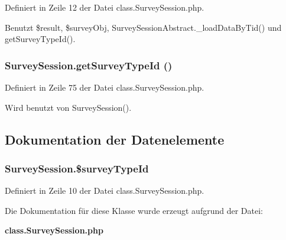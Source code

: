 Definiert in Zeile 12 der Datei class.SurveySession.php.

Benutzt \$result, \$surveyObj, SurveySessionAbstract.\_\-loadDataByTid() und getSurveyTypeId().
\subsubsection{\setlength{\rightskip}{0pt plus 5cm}SurveySession.getSurveyTypeId ()}\label{classSurveySession_b7aeadc8e4d024211081dd2db4334a90}




Definiert in Zeile 75 der Datei class.SurveySession.php.

Wird benutzt von SurveySession().

\subsection{Dokumentation der Datenelemente}
\subsubsection{\setlength{\rightskip}{0pt plus 5cm}SurveySession.\$surveyTypeId}\label{classSurveySession_b88274b03d65ff74ad033e4a626071b0}




Definiert in Zeile 10 der Datei class.SurveySession.php.

Die Dokumentation für diese Klasse wurde erzeugt aufgrund der Datei:\begin{CompactItemize}
\item 
{\bf class.SurveySession.php}\end{CompactItemize}

